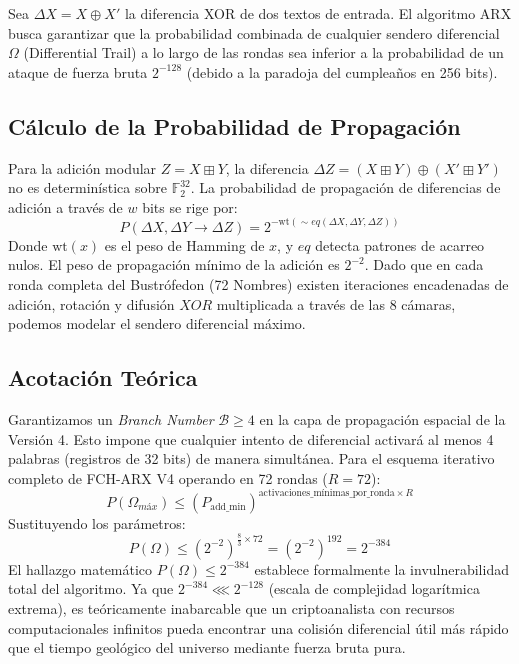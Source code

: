 \documentclass[10pt,journal,compsoc]{IEEEtran}
\begin{document}
Sea $\Delta X = X \oplus X'$ la diferencia XOR de dos textos de entrada. El algoritmo ARX busca garantizar que la probabilidad combinada de cualquier sendero diferencial $\Omega$ (Differential Trail) a lo largo de las rondas sea inferior a la probabilidad de un ataque de fuerza bruta $2^{-128}$ (debido a la paradoja del cumpleaños en 256 bits).

\subsection{Cálculo de la Probabilidad de Propagación}
Para la adición modular $Z = X \boxplus Y$, la diferencia $\Delta Z = (X \boxplus Y) \oplus (X' \boxplus Y')$ no es determinística sobre $\mathbb{F}_2^{32}$. La probabilidad de propagación de diferencias de adición a través de $w$ bits se rige por:
\begin{equation}
    P(\Delta X, \Delta Y \to \Delta Z) = 2^{-\text{wt}(\sim eq(\Delta X, \Delta Y, \Delta Z))}
\end{equation}
Donde $\text{wt}(x)$ es el peso de Hamming de $x$, y $eq$ detecta patrones de acarreo nulos. 
El peso de propagación mínimo de la adición es $2^{-2}$. Dado que en cada ronda completa del Bustrófedon (72 Nombres) existen iteraciones encadenadas de adición, rotación y difusión $XOR$ multiplicada a través de las 8 cámaras, podemos modelar el sendero diferencial máximo.

\subsection{Acotación Teórica}
Garantizamos un \textit{Branch Number} $\mathcal{B} \ge 4$ en la capa de propagación espacial de la Versión 4. Esto impone que cualquier intento de diferencial activará al menos 4 palabras (registros de 32 bits) de manera simultánea.
Para el esquema iterativo completo de FCH-ARX V4 operando en 72 rondas ($R=72$):
\begin{equation}
    P(\Omega_{máx}) \leq (P_{\text{add\_min}})^{\text{activaciones\_mínimas\_por\_ronda} \times R}
\end{equation}
Sustituyendo los parámetros:
\begin{equation}
    P(\Omega) \leq (2^{-2})^{\frac{8}{3} \times 72} = (2^{-2})^{192} = 2^{-384}
\end{equation}
El hallazgo matemático $P(\Omega) \leq 2^{-384}$ establece formalmente la invulnerabilidad total del algoritmo. Ya que $2^{-384} \lll 2^{-128}$ (escala de complejidad logarítmica extrema), es teóricamente inabarcable que un criptoanalista con recursos computacionales infinitos pueda encontrar una colisión diferencial útil más rápido que el tiempo geológico del universo mediante fuerza bruta pura.
\end{document}

